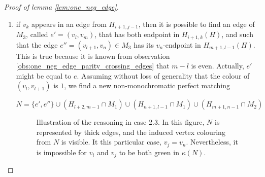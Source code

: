 \begin{proof}[Proof of lemma \ref{lem:one_neg_edge}]
\begin{enumerate}
\begin{enumerate}
            This works because we are sure that $k - (i + 1)$ is even from observation \ref{obs:one_neg_edge_parity_crossing_edges}. Since $e^- \in N$, $w(N) < 0$. But $w(\kappa(N)) = 0$ by definition of a perfectly monochromatic graph. Therefore, $\exists$ a non-monochromatic perfect matching $N'$ such that $\kappa(N') = \kappa(N)$ and $w(N') > 0$. This is possible only if $e^- \notin N'$. The only vertices that get colour $3$ in $\kappa(N) = \kappa(N')$ are $v_i, v_{i+1}, v_j$ and $v_k$. The only way to match these vertices in $N'$ with $3$-coloured edges without using $e^-$ is that $\exists e' = (v_i, v_k)$ and $e'' = (v_{i+1}, v_j)$ that have colour $3$ and that are included in $N'$. But this is impossible, because $k-i$ and $j-(i+1)$ are odd numbers, which is forbidden by observation \ref{obs:one_neg_edge_parity_crossing_edges}.

            \begin{figure}[H]
                \caption{Illustration of the reasoning in case 2.2. In this figure, $N$ is represented by thick edges, and the induced vertex colouring from $N$ is visible. The edges $e'$ and $e''$ that should be in $N'$ are also represented. It is clear in this figure that $e'$ and $e''$ can't exist using the parity argument.}
                \label{fig:unique_neg_2_2}
            \end{figure}

            \item if $v_k$ appears in an edge from $H_{i+1, j-1}$, then it is possible to find an edge of $M_3$, called $e' = (v_l, v_m)$, that has both endpoint in $H_{i+1, k}(H)$, and such that the edge $e'' = (v_{l+1}, v_n) \in M_3$ has its $v_n$-endpoint in $H_{m+1, l-1}(H)$. This is true because it is known from observation \ref{obs:one_neg_edge_parity_crossing_edges} that $m-l$ is even. Actually, $e'$ might be equal to $e$. Assuming without loss of generality that the colour of $(v_l, v_{l+1})$ is $1$, we find a new non-monochromatic perfect matching

            \begin{center}
                $N = \{e', e''\} \cup (H_{l+2, m-1} \cap M_1) \cup (H_{n+1, l-1} \cap M_1) \cup (H_{m+1, n-1} \cap M_2)$
            \end{center}

            \begin{figure}[H]
                \caption{Illustration of the reasoning in case 2.3. In this figure, $N$ is represented by thick edges, and the induced vertex colouring from $N$ is visible. It this particular case, $v_j = v_n$. Nevertheless, it is impossible for $v_i$ and $v_j$ to be both green in $\kappa(N)$.}
                \label{fig:unique_neg_2_3}
            \end{figure}


\end{enumerate}
\end{enumerate}
\end{proof}
